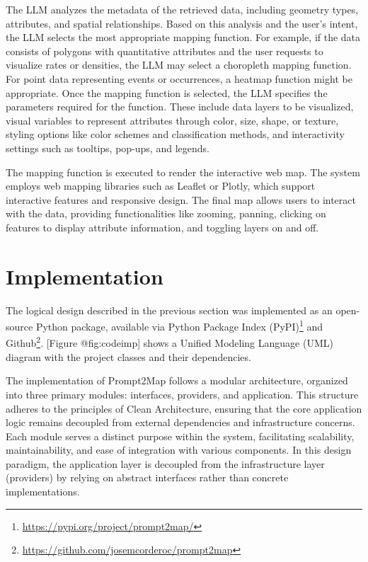 The LLM analyzes the metadata of the retrieved data, including geometry types, attributes, and spatial relationships. Based on this analysis and the user's intent, the LLM selects the most appropriate mapping function. For example, if the data consists of polygons with quantitative attributes and the user requests to visualize rates or densities, the LLM may select a choropleth mapping function. For point data representing events or occurrences, a heatmap function might be appropriate. Once the mapping function is selected, the LLM specifies the parameters required for the function. These include data layers to be visualized, visual variables to represent attributes through color, size, shape, or texture, styling options like color schemes and classification methods, and interactivity settings such as tooltips, pop-ups, and legends.

The mapping function is executed to render the interactive web map. The system employs web mapping libraries such as Leaflet or Plotly, which support interactive features and responsive design. The final map allows users to interact with the data, providing functionalities like zooming, panning, clicking on features to display attribute information, and toggling layers on and off.

\section{Implementation}

The logical design described in the previous section was implemented as an open-source Python package, available via Python Package Index (PyPI)\footnote{\url{https://pypi.org/project/prompt2map/}} and  Github\footnote{\url{https://github.com/josemcorderoc/prompt2map}}. [Figure @fig:codeimp] shows a Unified Modeling Language (UML) diagram with the project classes and their dependencies.


The implementation of Prompt2Map follows a modular architecture, organized into three primary modules: interfaces, providers, and application. This structure adheres to the principles of Clean Architecture, ensuring that the core application logic remains decoupled from external dependencies and infrastructure concerns. Each module serves a distinct purpose within the system, facilitating scalability, maintainability, and ease of integration with various components. In this design paradigm, the application layer is decoupled from the infrastructure layer (providers) by relying on abstract interfaces rather than concrete implementations. 

